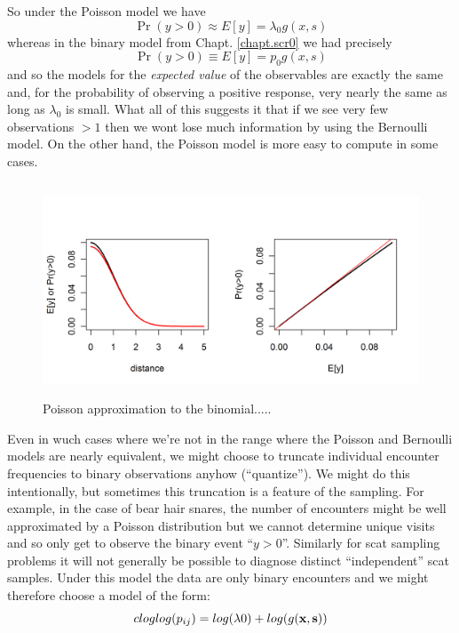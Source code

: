 So under the Poisson model we have
\[
\Pr(y>0) \approx E[y] = \lambda_{0} g(x,s)
\]
whereas in the binary model from Chapt. \ref{chapt.scr0} we had
precisely 
\[
\Pr(y>0) \equiv E[y] = p_{0} g(x,s)
\]
and so the models for the {\it expected value} of the observables
are exactly the same and, for the probability of observing a positive
response, very nearly the same as 
long as $\lambda_{0}$ is small.
What all of this suggests it that
if we see very few observations $>1$ then we wont lose much
information by using the Bernoulli model. On the other hand, the
Poisson model is more easy to compute in some cases. 


\begin{figure}
\centering
\includegraphics[width=5in,height=2.5in]{Ch5/figs/Poisson-Bern.png}
\caption{Poisson approximation to the binomial.....}
\label{poisson-mn.fig.poissonbern}
\end{figure}



Even in wuch cases where we're not in the range where the Poisson and
Bernoulli models are nearly equivalent, 
we might choose to truncate  individual encounter frequencies
to binary observations anyhow (``quantize'').
We might do
this intentionally, but sometimes this truncation is a feature of the
sampling. For example, in the case of bear hair snares, the number of
encounters might be well approximated by a Poisson distribution but we
cannot determine unique visits and so only get to observe the binary
event ``$y>0$''. Similarly for scat sampling problems it will not
generally be possible to diagnose distinct ``independent'' scat
samples. Under this model the data are only binary encounters and we
might therefore choose a model of the form:
\[
 cloglog(p_{ij}) = log(\lambda0)  + log(g({\bf x},{\bf s}))
\]

